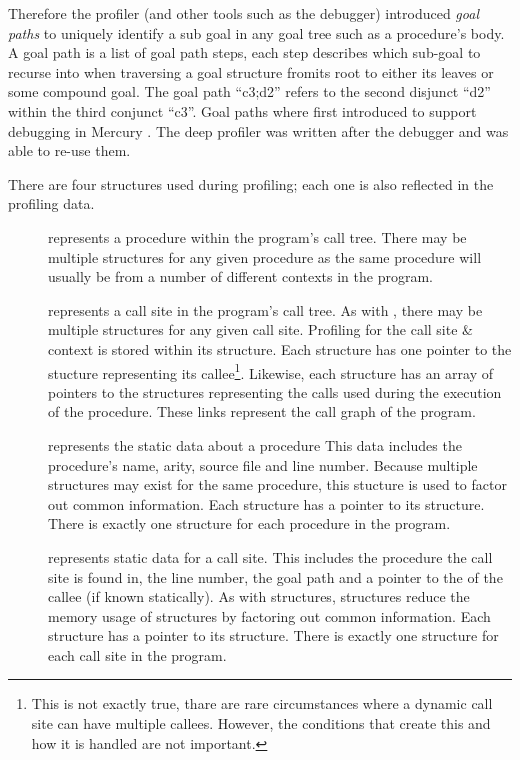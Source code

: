 Therefore the profiler
(and other tools such as the debugger) introduced \emph{goal paths}
to uniquely identify a sub goal in any goal tree such as a procedure's
body.
A goal path is a list of goal path steps, each step describes which
sub-goal to recurse into when traversing a goal structure fromits root
to either its leaves or some compound goal.
The goal path ``c3;d2'' refers to the second disjunct ``d2'' within the
third conjunct ``c3''.
Goal paths where first introduced to support debugging in Mercury \citep{mdb}.
The deep profiler was written after the debugger and was able to re-use them.

There are four structures used during profiling;
each one is also reflected in the profiling data.

\begin{description}

    \item[\PD]
    represents a procedure within the program's call tree.
    There may be multiple \PD structures for any given procedure as the
    same procedure will usually be from a number of different contexts
    in the program.

    \item[\CSD]
    represents a call site in the program's call tree.
    As with \PD, there may be multiple \CSD structures for any given
    call site.
    Profiling for the call site \& context is stored within its \CSD
    structure.
    Each \CSD structure has one pointer to the \PD stucture representing
    its callee\footnote{
        This is not exactly true,
        thare are rare circumstances where a dynamic call site can have
        multiple callees.
        However, the conditions that create this and how it is handled
        are not important.}.
    Likewise, each \PD structure has an array of pointers to the \CSD
    structures representing the calls used during the execution of the
    procedure.
    These links represent the call graph of the program.

    \item[\PS]
    represents the static data about a procedure
    This data includes the procedure's name, arity, source file and line
    number.
    Because multiple \PD structures may exist for the same procedure,
    this stucture is used to factor out common information.
    Each \PD structure has a pointer to its \PS structure.
    There is exactly one \PS structure for each procedure in the
    program.

    \item[\CSS]
    represents static data for a call site.
    This includes the procedure the call site is found in, the line number,
    the goal path and a pointer to the \PS of the callee (if known
    statically).
    As with \PS structures,
    \CSS structures reduce the memory usage of \CSD structures by
    factoring out common information.
    Each \CSD structure has a pointer to its \CSS structure.
    There is exactly one \CSS structure for each call site in the
    program.

\end{description}

